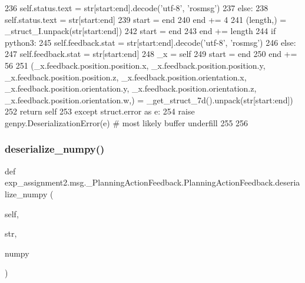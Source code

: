 \begin{DoxyCode}
236         self.status.text = str[start:end].decode(\textcolor{stringliteral}{'utf-8'}, \textcolor{stringliteral}{'rosmsg'})
237       \textcolor{keywordflow}{else}:
238         self.status.text = str[start:end]
239       start = end
240       end += 4
241       (length,) = \_struct\_I.unpack(str[start:end])
242       start = end
243       end += length
244       \textcolor{keywordflow}{if} python3:
245         self.feedback.stat = str[start:end].decode(\textcolor{stringliteral}{'utf-8'}, \textcolor{stringliteral}{'rosmsg'})
246       \textcolor{keywordflow}{else}:
247         self.feedback.stat = str[start:end]
248       \_x = self
249       start = end
250       end += 56
251       (\_x.feedback.position.position.x, \_x.feedback.position.position.y, \_x.feedback.position.position.z, 
      \_x.feedback.position.orientation.x, \_x.feedback.position.orientation.y, \_x.feedback.position.orientation.z, 
      \_x.feedback.position.orientation.w,) = \_get\_struct\_7d().unpack(str[start:end])
252       \textcolor{keywordflow}{return} self
253     \textcolor{keywordflow}{except} struct.error \textcolor{keyword}{as} e:
254       \textcolor{keywordflow}{raise} genpy.DeserializationError(e)  \textcolor{comment}{# most likely buffer underfill}
255 
256 
\end{DoxyCode}
\mbox{\label{classexp__assignment2_1_1msg_1_1__PlanningActionFeedback_1_1PlanningActionFeedback_a58a445bb957bdbde185cf2eefa6035e0}} 
\subsubsection{\texorpdfstring{deserialize\+\_\+numpy()}{deserialize\_numpy()}}
{\footnotesize\ttfamily def exp\+\_\+assignment2.\+msg.\+\_\+\+Planning\+Action\+Feedback.\+Planning\+Action\+Feedback.\+deserialize\+\_\+numpy (\begin{DoxyParamCaption}\item[{}]{self,  }\item[{}]{str,  }\item[{}]{numpy }\end{DoxyParamCaption})}

